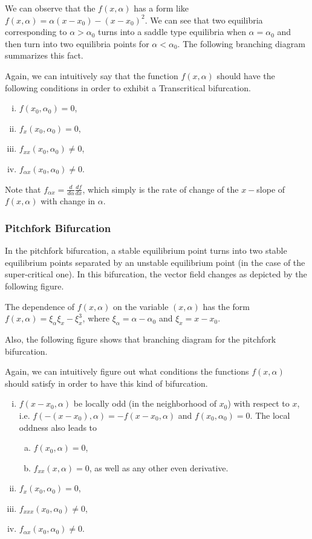 

We can observe that the $f(x,\alpha)$ has a form like $f(x,\alpha) = \alpha (x-x_0) - (x-x_0)^2$. We can see that two equilibria corresponding to $\alpha>\alpha_0$ turns into a saddle type equilibria when $\alpha = \alpha_0$ and then turn into two equilibria points for $\alpha<\alpha_0$. The following branching diagram summarizes this fact.



Again, we can intuitively say that the function $f(x,\alpha)$ should have the following conditions in order to exhibit a Transcritical bifurcation.

\begin{enumerate}[(i)]
	\item $f(x_0,\alpha_0) = 0$,
	\item $f_x(x_0,\alpha_0) = 0$,
	\item $f_{xx}(x_0,\alpha_0) \neq  0$,
	\item $f_{\alpha x} (x_0,\alpha_0) \neq 0$.
\end{enumerate}
Note that $f_{\alpha x} = \frac{d}{d\alpha} \frac{df}{dx}$, which simply is the rate of change of the $x-$slope of $f(x,\alpha)$ with change in $\alpha$.


\subsubsection{Pitchfork Bifurcation}
In the pitchfork bifurcation, a stable equilibrium point turns into two stable equilibrium points separated by an unstable equilibrium point (in the case of the super-critical one). In this bifurcation, the vector field changes as depicted by the following figure.


The dependence of $f(x,\alpha)$ on the variable $(x,\alpha)$ has the form $f(x,\alpha) = \xi_\alpha \xi_x - \xi_x^3$, where $\xi_\alpha = \alpha - \alpha_0$ and $\xi_x = x - x_0$.

Also, the following figure shows that branching diagram for the pitchfork bifurcation.


Again, we can intuitively figure out what conditions the functions $f(x,\alpha)$ should satisfy in order to have this kind of bifurcation.

\begin{enumerate}[(i)]
	\item $f(x-x_0,\alpha)$ be locally odd (in the neighborhood of $x_0$) with respect to $x$, i.e. $f(-(x-x_0),\alpha) = - f(x-x_0,\alpha)$ and $f(x_0,\alpha_0) =0 $. The local oddness also leads to 
	\begin{enumerate}[(a)]
		\item $f(x_0,\alpha) = 0$,
		\item $f_{xx}(x,\alpha)=0$, as well as any other even derivative.
	\end{enumerate} 
	\item $f_x(x_0,\alpha_0) =0$,
	\item $f_{xxx}(x_0,\alpha_0) \neq 0$,
	\item $f_{\alpha x} (x_0,\alpha_0) \neq 0$.
\end{enumerate}